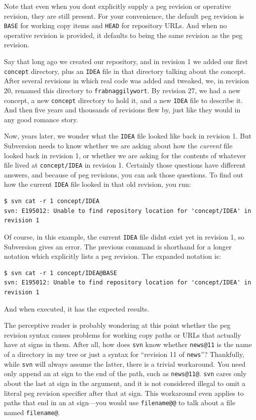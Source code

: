 Note that even when you don\textquotesingle t explicitly supply a peg
revision or operative revision, they are still present. For your
convenience, the default peg revision is \texttt{BASE} for working copy
items and \texttt{HEAD} for repository URLs. And when no operative
revision is provided, it defaults to being the same revision as the peg
revision.

Say that long ago we created our repository, and in revision 1 we added
our first \texttt{concept} directory, plus an \texttt{IDEA} file in that
directory talking about the concept. After several revisions in which
real code was added and tweaked, we, in revision 20, renamed this
directory to \texttt{frabnaggilywort}. By revision 27, we had a new
concept, a new \texttt{concept} directory to hold it, and a new
\texttt{IDEA} file to describe it. And then five years and thousands of
revisions flew by, just like they would in any good romance story.

Now, years later, we wonder what the \texttt{IDEA} file looked like back
in revision 1. But Subversion needs to know whether we are asking about
how the \emph{current} file looked back in revision 1, or whether we are
asking for the contents of whatever file lived at \texttt{concept/IDEA}
in revision 1. Certainly those questions have different answers, and
because of peg revisions, you can ask those questions. To find out how
the current \texttt{IDEA} file looked in that old revision, you run:

\begin{verbatim}
$ svn cat -r 1 concept/IDEA 
svn: E195012: Unable to find repository location for 'concept/IDEA' in revision 1
\end{verbatim}

Of course, in this example, the current \texttt{IDEA} file
didn\textquotesingle t exist yet in revision 1, so Subversion gives an
error. The previous command is shorthand for a longer notation which
explicitly lists a peg revision. The expanded notation is:

\begin{verbatim}
$ svn cat -r 1 concept/IDEA@BASE
svn: E195012: Unable to find repository location for 'concept/IDEA' in revision 1
\end{verbatim}

And when executed, it has the expected results.

The perceptive reader is probably wondering at this point whether the
peg revision syntax causes problems for working copy paths or URLs that
actually have at signs in them. After all, how does \texttt{svn} know
whether \texttt{news@11} is the name of a directory in my tree or just a
syntax for ``revision 11 of \texttt{news}''? Thankfully, while
\texttt{svn} will always assume the latter, there is a trivial
workaround. You need only append an at sign to the end of the path, such
as \texttt{news@11@}. \texttt{svn} cares only about the last at sign in
the argument, and it is not considered illegal to omit a literal peg
revision specifier after that at sign. This workaround even applies to
paths that end in an at sign---you would use \texttt{filename@@} to talk
about a file named \texttt{filename@}.

